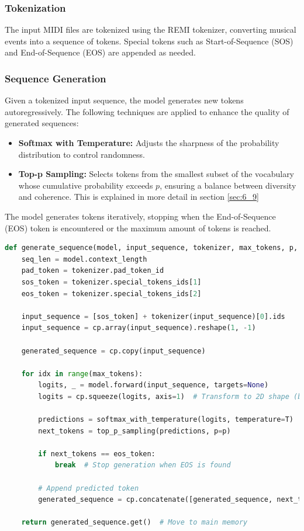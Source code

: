 \documentclass[a4paper,12pt]{extarticle}
\begin{document}
\subsubsection{Tokenization}
The input MIDI files are tokenized using the REMI tokenizer, converting musical events into a sequence of tokens. Special tokens such as Start-of-Sequence (SOS) and End-of-Sequence (EOS) are appended as needed.
\subsubsection{Sequence Generation}
Given a tokenized input sequence, the model generates new tokens autoregressively. The following techniques are applied to enhance the quality of generated sequences:
\begin{itemize}
    \item \textbf{Softmax with Temperature:} Adjusts the sharpness of the probability distribution to control randomness.
    \item \textbf{Top-p Sampling:} Selects tokens from the smallest subset of the vocabulary whose cumulative probability exceeds $p$, ensuring a balance between diversity and coherence. This is explained in more detail in section \ref{sec:6_9}
\end{itemize}

The model generates tokens iteratively, stopping when the End-of-Sequence (EOS) token is encountered or the maximum amount of tokens is reached.

\begin{lstlisting}[language=Python, caption=Generating sequence with EOS stopping condition]
def generate_sequence(model, input_sequence, tokenizer, max_tokens, p, T):
    seq_len = model.context_length
    pad_token = tokenizer.pad_token_id
    sos_token = tokenizer.special_tokens_ids[1]
    eos_token = tokenizer.special_tokens_ids[2]
    
    input_sequence = [sos_token] + tokenizer(input_sequence)[0].ids
    input_sequence = cp.array(input_sequence).reshape(1, -1)
    
    generated_sequence = cp.copy(input_sequence)
    
    for idx in range(max_tokens):
        logits, _ = model.forward(input_sequence, targets=None)
        logits = cp.squeeze(logits, axis=1)  # Transform to 2D shape (batch, vocab)
        
        predictions = softmax_with_temperature(logits, temperature=T)
        next_tokens = top_p_sampling(predictions, p=p)
        
        if next_tokens == eos_token:
            break  # Stop generation when EOS is found
        
        # Append predicted token
        generated_sequence = cp.concatenate([generated_sequence, next_tokens], axis=1)
    
    return generated_sequence.get()  # Move to main memory
\end{lstlisting}
\end{document}

